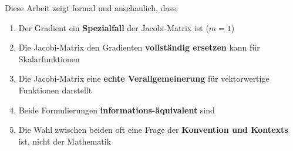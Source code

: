 ﻿\documentclass[a4paper,12pt]{article}
\theoremstyle{definition}
\begin{document}
Diese Arbeit zeigt formal und anschaulich, dass:

\begin{enumerate}
	\item Der Gradient ein \textbf{Spezialfall} der Jacobi-Matrix ist ($m=1$)
	\item Die Jacobi-Matrix den Gradienten \textbf{vollständig ersetzen} kann für Skalarfunktionen
	\item Die Jacobi-Matrix eine \textbf{echte Verallgemeinerung} für vektorwertige Funktionen darstellt
	\item Beide Formulierungen \textbf{informations-äquivalent} sind
	\item Die Wahl zwischen beiden oft eine Frage der \textbf{Konvention und Kontexts} ist, nicht der Mathematik
\end{enumerate}

\newpage
\end{document}
